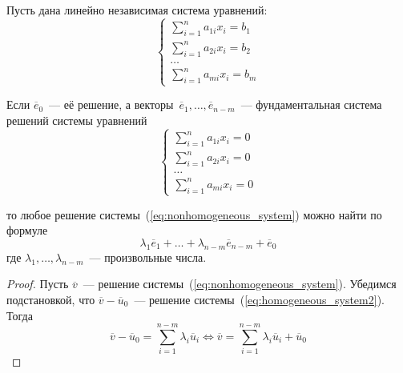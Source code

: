 \begin{theorem}
Пусть дана линейно независимая система уравнений:
\begin{equation}
\label{eq:nonhomogeneous_system}
\begin{cases}
\displaystyle \sum_{i=1}^n a_{1i} x_i = b_1 \\
\displaystyle \sum_{i=1}^n a_{2i} x_i = b_2 \\
\ldots \\
\displaystyle \sum_{i=1}^n a_{mi} x_i = b_m
\end{cases}
\end{equation}

Если $\overline e_0$~--- её решение, а векторы~$\overline e_1, \ldots, \overline e_{n-m}$~--- фундаментальная система решений системы уравнений
\begin{equation}
\label{eq:homogeneous_system2}
\begin{cases}
\displaystyle \sum_{i=1}^n a_{1i} x_i = 0 \\
\displaystyle \sum_{i=1}^n a_{2i} x_i = 0 \\
\ldots \\
\displaystyle \sum_{i=1}^n a_{mi} x_i = 0
\end{cases}
\end{equation}

то любое решение системы~(\ref*{eq:nonhomogeneous_system}) можно найти по формуле
\begin{equation*}
\lambda_1 \overline e_1 + \ldots + \lambda_{n-m} \overline e_{n-m} + \overline e_0
\end{equation*}
где $\lambda_1, \ldots, \lambda_{n-m}$~--- произвольные числа.
\end{theorem}
\begin{proof}
Пусть $\overline v$~--- решение системы~(\ref*{eq:nonhomogeneous_system}).
Убедимся подстановкой, что $\overline v - \overline u_0$~--- решение системы~(\ref*{eq:homogeneous_system2}).
Тогда
\begin{equation*}
\overline v - \overline u_0 = \sum_{i=1}^{n-m} \lambda_i \overline u_i \Leftrightarrow
\overline v = \sum_{i=1}^{n-m} \lambda_i \overline u_i + \overline u_0
\end{equation*}
\end{proof}